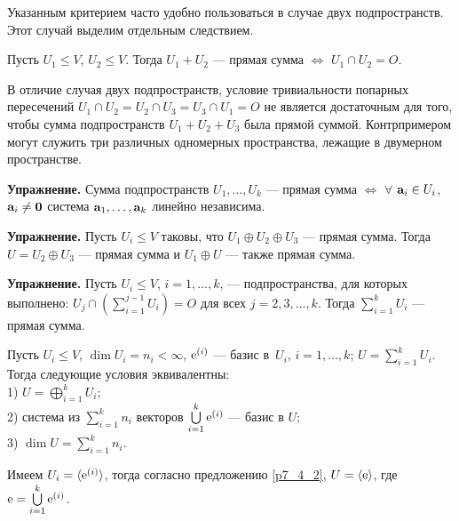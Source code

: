 \otstup
Указанным критерием часто удобно пользоваться в случае двух подпространств. 
Этот случай выделим отдельным следствием.

\begin{sled}
Пусть $U_1\leq V$, $U_2\leq V$. Тогда $U_1+U_2$ --- прямая сумма $\Leftrightarrow$ $U_1\cap U_2 = O$.
\end{sled}

\otstup


В отличие случая двух подпространств, 
условие тривиальности попарных пересечений
$U_1\cap U_2 = U_2\cap U_3 = U_3\cap U_1 = O$ не является достаточным для того, чтобы сумма подпространств
$U_1+U_2+U_3$ была прямой суммой. 
Контрпримером могут служить три различных одномерных пространства,
лежащие в двумерном пространстве.

\otstup


{\bf Упражнение.}
Сумма подпространств $U_1, \ldots, U_k$ --- прямая сумма 
$\Leftrightarrow$
$\forall$ $\mathbf{a}_i\in U_i$, $\mathbf{a}_i\neq \mathbf{0}$
система $\mathbf{a}_1, \ldots, \mathbf{a}_k$ линейно независима.

\otstup

{\bf Упражнение.} Пусть $U_i\leq V$ таковы, что 
$U_1\oplus U_2\oplus U_3$ --- прямая сумма. Тогда $U=U_2\oplus U_3$ --- прямая сумма и 
$U_1\oplus U$ --- также прямая сумма.

\otstup

{\bf Упражнение.} Пусть $U_i\leq V$, $i=1, \ldots, k$, --- подпространства, для которых выполнено: 
$U_j\cap (\sum\limits_{i=1}^{j-1} U_i) = O$ для всех $j=2, 3, \ldots, k$.
Тогда $\sum\limits_{i=1}^{k} U_i$ --- прямая сумма.


\begin{theor}\label{t7_4_2}
Пусть $U_i\leq V$, $\dim U_i=n_i<\infty$, $\mathrm{e}^{(i)}$ --- базис в~$U_i$, $i=1, \ldots, k$;
$U=\sum \limits_{i=1}^{k} U_i$. Тогда следующие условия эквивалентны:\\
1) $U= \bigoplus \limits_{i=1}^{k} U_i$;\\
2) система из $\sum \limits_{i=1}^{k}n_i$ векторов $\bigcup\limits_{i=1}^{k} \mathrm{e}^{(i)}$ --- базис
в  $U$;\\
3) $\dim U = \sum \limits_{i=1}^{k} n_i$.
\end{theor}
\dok Имеем  $U_i = \langle \mathrm{e}^{(i)} \rangle$, тогда согласно предложению 
\ref{p7_4_2}, $U = \langle \mathrm{e} \rangle$, где $\mathrm{e}=\bigcup\limits_{i=1}^{k} \mathrm{e}^{(i)}$.

